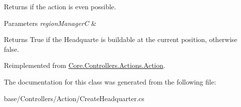 Returns if the action is even possible. 


\begin{DoxyParams}{Parameters}
{\em region\-Manager\-C} & \\
\hline
\end{DoxyParams}
\begin{DoxyReturn}{Returns}
True if the Headquarte is buildable at the current position, otherwise false.
\end{DoxyReturn}


Reimplemented from \hyperlink{classCore_1_1Controllers_1_1Actions_1_1Action_a405b995343a9394ad19e05a699a4e6d9}{Core.\-Controllers.\-Actions.\-Action}.



The documentation for this class was generated from the following file\-:\begin{DoxyCompactItemize}
\item 
base/\-Controllers/\-Action/Create\-Headquarter.\-cs\end{DoxyCompactItemize}
